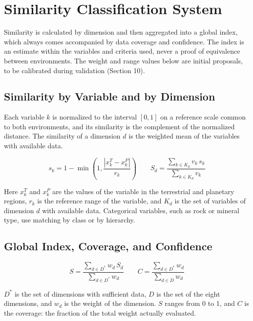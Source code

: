 \documentclass[12pt,letterpaper]{article}
\begin{document}
\section{Similarity Classification System}

Similarity is calculated by dimension and then aggregated into a global index, which always comes accompanied by data coverage and confidence. The index is an estimate within the variables and criteria used, never a proof of equivalence between environments. The weight and range values below are initial proposals, to be calibrated during validation (Section 10).

\subsection{Similarity by Variable and by Dimension}

Each variable $k$ is normalized to the interval $[0,1]$ on a reference scale common to both environments, and its similarity is the complement of the normalized distance. The similarity of a dimension $d$ is the weighted mean of the variables with available data.

\begin{equation}
s_k = 1 - \min\left(1, \frac{\left|x_k^{T} - x_k^{P}\right|}{r_k}\right)
\qquad
S_d = \frac{\sum_{k \in K_d} v_k \, s_k}{\sum_{k \in K_d} v_k}
\end{equation}

Here $x_k^T$ and $x_k^P$ are the values of the variable in the terrestrial and planetary regions, $r_k$ is the reference range of the variable, and $K_d$ is the set of variables of dimension $d$ with available data. Categorical variables, such as rock or mineral type, use matching by class or by hierarchy.

\subsection{Global Index, Coverage, and Confidence}

\begin{equation}
S = \frac{\sum_{d \in D^{*}} w_d \, S_d}{\sum_{d \in D^{*}} w_d}
\qquad
C = \frac{\sum_{d \in D^{*}} w_d}{\sum_{d \in D} w_d}
\end{equation}

$D^*$ is the set of dimensions with sufficient data, $D$ is the set of the eight dimensions, and $w_d$ is the weight of the dimension. $S$ ranges from 0 to 1, and $C$ is the coverage: the fraction of the total weight actually evaluated.
\end{document}
